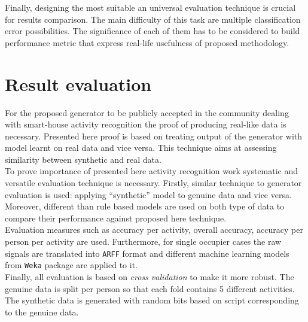 \documentclass[11pt, a4paper, pdflatex, leqno, twoside, openright]{report}
\begin{document}
Finally, designing the most suitable an universal evaluation technique is crucial for results comparison. The main difficulty of this task are multiple classification error possibilities. The significance of each of them has to be considered to build performance metric that express real-life usefulness of proposed methodology.

\section{Result evaluation}
For the proposed generator to be publicly accepted in the community dealing with smart-house activity recognition the proof of producing real-like data is necessary. Presented here proof is based on treating output of the generator with model learnt on real data and vice versa. This technique aims at assessing similarity between synthetic and real data.\\

To prove importance of presented here activity recognition work systematic and versatile evaluation technique is necessary. Firstly, similar technique to generator evaluation is used: applying ``synthetic'' model to genuine data and vice versa. Moreover, different than rule based models are used on both type of data to compare their performance against proposed here technique.\\
Evaluation measures such as accuracy per activity, overall accuracy, accuracy per person per activity are used. Furthermore, for single occupier cases the raw signals are translated into \texttt{ARFF} format and different machine learning models from \texttt{Weka} package are applied to it.\\
Finally, all evaluation is based on \emph{cross validation} to make it more robust. The genuine data is split per person so that each fold contains 5 different activities. The synthetic data is generated with random bits based on script corresponding to the genuine data.


\end{document}
